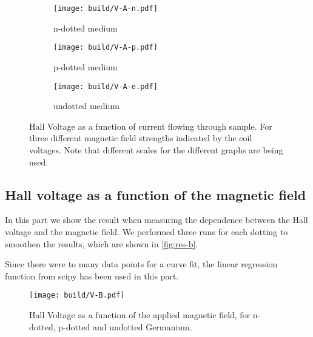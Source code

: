 \begin{figure}
     \centering
     \begin{subfigure}[b]{0.4\textwidth}
         \centering
         \texttt{[image: build/V-A-n.pdf]}
         \caption{n-dotted medium}
         \label{fig:a-n}
     \end{subfigure}
     \hfill
     \begin{subfigure}[b]{0.4\textwidth}
         \centering
         \texttt{[image: build/V-A-p.pdf]}
         \caption{p-dotted medium}
         \label{fig:a-p}
     \end{subfigure}
     \hfill
     \begin{subfigure}[b]{0.4\textwidth}
         \centering
         \texttt{[image: build/V-A-e.pdf]}
         \caption{undotted medium}
         \label{fig:a-e}
     \end{subfigure}
        \caption{Hall Voltage as a function of current flowing through sample. For three different
        magnetic field strengths indicated by the coil voltages. Note that different scales for the
      different graphs are being used.}
        \label{fig:res-a}
\end{figure}

\subsection{Hall voltage as a function of the magnetic field}
\label{sec:res-b}
In this part we show the result when measuring the dependence between the Hall voltage and the
magnetic field. We performed three runs for each dotting to smoothen the results, which are shown 
in \autoref{fig:res-b}. 

Since there were to many data points for a curve fit, the linear regression function from scipy has
been used in this part.

\begin{figure}
     \centering
         \texttt{[image: build/V-B.pdf]}
        \caption{Hall Voltage as a function of the applied magnetic field, for n-dotted, p-dotted
        and undotted Germanium.}
        \label{fig:res-b}
\end{figure}
